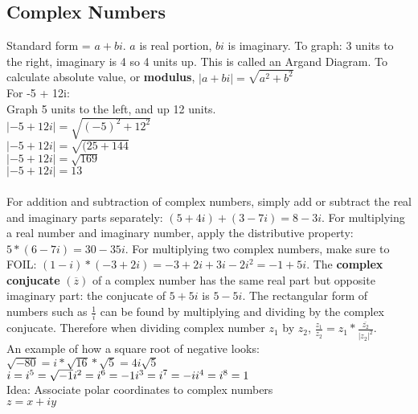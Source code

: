 \documentclass{article}
\begin{document}
        \subsection*{Complex Numbers}
            Standard form = $a + bi$. $a$ is real portion, $bi$ is imaginary. 
            To graph: 3 units to the right, imaginary is 4 so 4 units up. This is called an Argand Diagram. To calculate absolute value, or \textbf{modulus}, $\lvert a+bi \rvert = \sqrt{a^2 + b^2}$\\
            For -5 + 12i: \\
            Graph 5 units to the left, and up 12 units. \\
            $\lvert {-5 + 12i}\rvert = \sqrt{(-5)^2 + 12^2}$ \\
            $\lvert {-5 + 12i}\rvert = \sqrt{(25 + 144}$ \\
            $\lvert {-5 + 12i}\rvert = \sqrt{169}$ \\
            $\lvert {-5 + 12i}\rvert = 13$ \\
            \\
            For addition and subtraction of complex numbers, simply add or subtract the real and imaginary parts separately: $(5 + 4i) + (3 -7i) = 8 - 3i$. For multiplying a real number and imaginary number, apply the distributive property: $5 * (6 - 7i) = 30 - 35i$. For multiplying two complex numbers, make sure to FOIL: $(1-i)*(-3+2i)=-3+2i+3i-2i^2 = -1 +5i$. The \textbf{complex conjucate} $(\overline{z})$ of a complex number has the same real part but opposite imaginary part: the conjucate of $5 + 5i$ is $5 - 5i$. The rectangular form of numbers such as $\frac{1}{i}$ can be found by multiplying and dividing by the complex conjucate. Therefore when dividing complex number $z_{1}$ by $z_{2}$, $\frac{z_{1}}{z_{2}} = z_{1} * \frac{\overline{z_{2}}}{\lvert z_{2} \rvert ^2}$.\\
            An example of how a square root of negative looks: $\sqrt{-80} =  i * \sqrt{16} * \sqrt{5} = 4i \sqrt{5}$ \\
                    $i = i^5 = \sqrt{-1} \\
                    i^2 = i^6 = -1 \\
                    i^3 = i^7 = -i \\
                    i^4 = i^8 = 1$ \\
            Idea: Associate polar coordinates to complex numbers \\
            $z = x+iy$ \\
\end{document}
